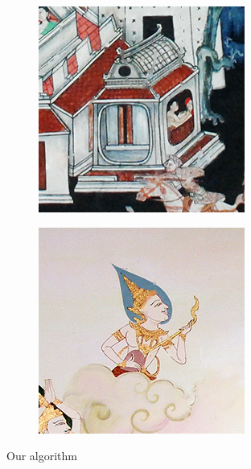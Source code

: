 \documentclass[xcolor=dvipsnames, xetex,serif]{beamer}
\begin{document}
\begin{frame}
\begin{figure}[H]
\begin{subfigure}{0.15\linewidth}
            \end{subfigure}
            \begin{subfigure}{0.15\linewidth}
                \centering
                \includegraphics[width=0.9\linewidth]{images/result_ex4/multisplitbergman_case04.png}			
            \end{subfigure}
            \begin{subfigure}{0.15\linewidth}
                \centering
                \includegraphics[width=0.9\linewidth]{images/result_ex4/multisplitbergman_case05.png}			
            \end{subfigure}
            \caption{Our algorithm}
        \end{figure}
    \end{frame}
\end{document}
